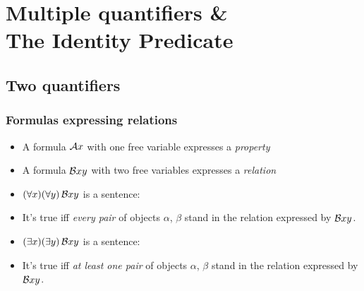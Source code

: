 ﻿%

\setcounter{section}{10}

\section{Multiple quantifiers \& \\ \qquad The Identity Predicate}

\begin{frame}

\scriptsize{\tableofcontents}

\end{frame}

\subsection{Two quantifiers}

\begin{frame}
  \frametitle{Formulas expressing relations}

\begin{itemize}[<+->]
  \item A formula $\mathcal{A}x$ with one free variable expresses a \emph{property}
  \item A formula $\mathcal{B}xy$ with two free variables expresses a \emph{relation}
  \item $(\forall x)(\forall y)\, \mathcal{B}xy$ is a sentence: 
  \item It's true iff 
  \emph{every pair} of objects $\alpha$, $\beta$ stand in the relation expressed by $\mathcal{B}xy$.
  \item $(\exists x)(\exists y)\, \mathcal{B}xy$ is a sentence:
  \item It's true iff
  \emph{at least one pair} of objects $\alpha$, $\beta$ stand in the relation expressed by $\mathcal{B}xy$.
\end{itemize}
\end{frame}

